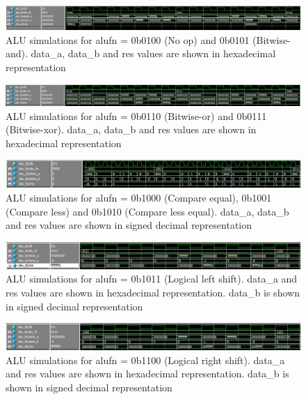 \begin{figure}[H]
    \centering
    \includegraphics[width=\linewidth]{Chapter3-CPU/res/alu_simu_1_0.PNG}
    \caption{ALU simulations for alufn = 0b0100 (No op) and 0b0101 (Bitwise-and). data\_a, data\_b and
    res values are shown in hexadecimal representation}
    \label{fig:sim/alu_1}
\end{figure}

\begin{figure}[H]
    \centering
    \includegraphics[width=\linewidth]{Chapter3-CPU/res/alu_simu_1_1.PNG}
    \caption{ALU simulations for alufn = 0b0110 (Bitwise-or) and 0b0111 (Bitwise-xor). data\_a, data\_b and
    res values are shown in hexadecimal representation}
    \label{fig:sim/alu_2}
\end{figure}

\begin{figure}[H]
    \centering
    \includegraphics[width=\linewidth]{Chapter3-CPU/res/alu_simu_2.PNG}
    \caption{ALU simulations for alufn = 0b1000 (Compare equal), 0b1001 (Compare less) and
    0b1010 (Compare less equal). data\_a, data\_b and res values are shown in signed decimal 
    representation}
    \label{fig:sim/alu_3}
\end{figure}

\begin{figure}[H]
    \centering
    \includegraphics[width=\linewidth]{Chapter3-CPU/res/alu_simu_3_0.PNG}
    \caption{ALU simulations for alufn = 0b1011 (Logical left shift). data\_a and
    res values are shown in hexadecimal representation. data\_b is shown in signed decimal 
    representation}
    \label{fig:sim/alu_4}
\end{figure}

\begin{figure}[H]
    \centering
    \includegraphics[width=\linewidth]{Chapter3-CPU/res/alu_simu_3_1.PNG}
    \caption{ALU simulations for alufn = 0b1100 (Logical right shift). data\_a and
    res values are shown in hexadecimal representation. data\_b is shown in signed decimal 
    representation}
    \label{fig:sim/alu_5}
\end{figure}

